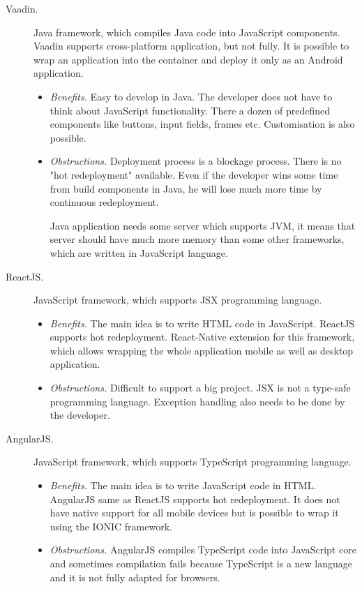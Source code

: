 \begin{description}
\item[Vaadin.] Java framework, which compiles Java code into JavaScript components. Vaadin supports cross-platform application, but not fully. It is possible to wrap an application into the container and deploy it only as an Android application.

\begin{itemize}
\item \emph{Benefits.} Easy to develop in Java. The developer does not have to think about JavaScript functionality. There a dozen of predefined components like buttons, input fields, frames etc. Customisation is also possible. 
\item \emph{Obstructions.} Deployment process is a blockage process. There is no "hot redeployment" available. Even if the developer wins some time from build components in Java, he will lose much more time by continuous redeployment. 

Java application needs some server which supports JVM, it means that server should have much more memory than some other frameworks, which are written in JavaScript language.  
\end{itemize}

\item[ReactJS.]  JavaScript framework, which supports JSX programming language. 
\begin{itemize} 
\item \emph{Benefits.} The main idea is to write HTML code in JavaScript. ReactJS supports hot redeployment.  React-Native extension for this framework, which allows wrapping the whole application mobile as well as desktop application.
\item \emph{Obstructions.} Difficult to support a big project. JSX is not a type-safe programming language. Exception handling also needs to be done by the developer.  
\end{itemize}
\item[AngularJS.] JavaScript framework, which supports TypeScript programming language.
\begin{itemize} 
\item \emph{Benefits.} The main idea is to write JavaScript code in HTML.  AngularJS same as ReactJS supports hot redeployment.  It does not have native support for all mobile devices but is possible to wrap it using the IONIC framework. 
\item \emph{Obstructions.}  AngularJS compiles TypeScript code into JavaScript core and sometimes compilation fails because TypeScript is a new language and it is not fully adapted for browsers. 
\end{itemize}
\end{description}
 
